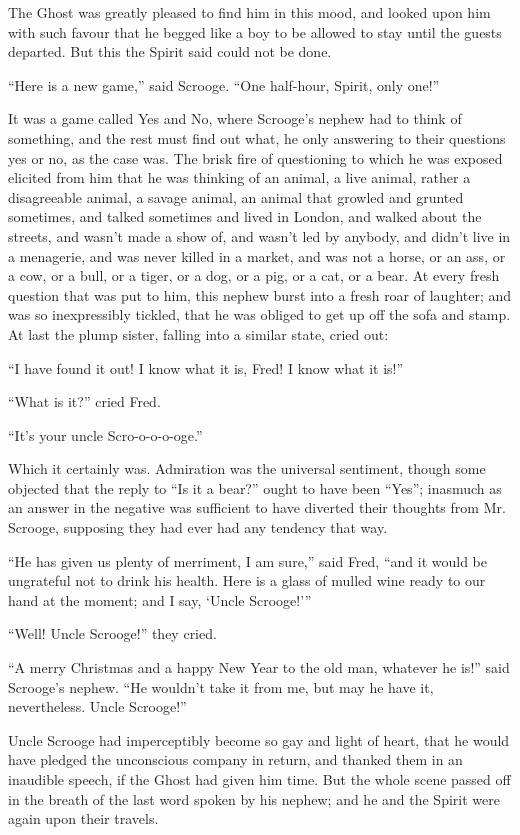 \documentclass[paper=a5,BCOR=15mm,twoside,DIV=15,headinclude=off,12pt,chapterprefix=off,openany,headings=huge]{scrbook} %
\begin{document}
The Ghost was greatly pleased to find him in this mood, and looked upon him with such favour that he begged like a boy to be allowed to stay until the guests departed. But this the Spirit said could not be done.

\enquote{Here is a new game,} said Scrooge. \enquote{One half-hour, Spirit, only one!}

It was a game called Yes and No, where Scrooge's nephew had to think of something, and the rest must find out what, he only answering to their questions yes or no, as the case was. The brisk fire of questioning to which he was exposed elicited from him that he was thinking of an animal, a live animal, rather a disagreeable animal, a savage animal, an animal that growled and grunted sometimes, and talked sometimes and lived in London, and walked about the streets, and wasn't made a show of, and wasn't led by anybody, and didn't live in a menagerie, and was never killed in a market, and was not a horse, or an ass, or a cow, or a bull, or a tiger, or a dog, or a pig, or a cat, or a bear. At every fresh question that was put to him, this nephew burst into a fresh roar of laughter; and was so inexpressibly tickled, that he was obliged to get up off the sofa and stamp. At last the plump sister, falling into a similar state, cried out:

\enquote{I have found it out! I know what it is, Fred! I know what it is!}

\enquote{What is it?} cried Fred.

\enquote{It's your uncle Scro-o-o-o-oge.}

Which it certainly was. Admiration was the universal sentiment, though some objected that the reply to \enquote{Is it a bear?} ought to have been \enquote{Yes}; inasmuch as an answer in the negative was sufficient to have diverted their thoughts from Mr. Scrooge, supposing they had ever had any tendency that way.

\enquote{He has given us plenty of merriment, I am sure,} said Fred, \enquote{and it would be ungrateful not to drink his health. Here is a glass of mulled wine ready to our hand at the moment; and I say, \enquote{Uncle Scrooge!}}

\enquote{Well! Uncle Scrooge!} they cried.

\enquote{A merry Christmas and a happy New Year to the old man, whatever he is!} said Scrooge's nephew. \enquote{He wouldn't take it from me, but may he have it, nevertheless. Uncle Scrooge!}

Uncle Scrooge had imperceptibly become so gay and light of heart, that he would have pledged the unconscious company in return, and thanked them in an inaudible speech, if the Ghost had given him time. But the whole scene passed off in the breath of the last word spoken by his nephew; and he and the Spirit were again upon their travels.
\end{document}
